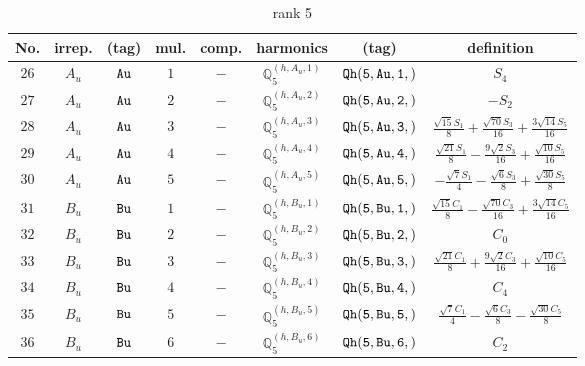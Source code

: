 \documentclass[fleqn,8pt]{jsarticle}
\begin{document}
\begin{table}[ht!]
\begin{center}
\caption{rank 5}
\renewcommand{\arraystretch}{1.3}
\begin{tabular}{cccccccc} \hline \hline
No. & irrep. & (tag) & mul. & comp. & harmonics & (tag) & definition \\ \hline
$ 26 $ & $ A_{u} $ & $ {\tt Au} $ & $ 1 $ & $ - $ & $ \mathbb{Q}_{5}^{(h,A_{u},1)} $ & $ {\tt Qh(5,Au,1,)} $ & $ S_{4} $ \\
$ 27 $ & $ A_{u} $ & $ {\tt Au} $ & $ 2 $ & $ - $ & $ \mathbb{Q}_{5}^{(h,A_{u},2)} $ & $ {\tt Qh(5,Au,2,)} $ & $ - S_{2} $ \\
$ 28 $ & $ A_{u} $ & $ {\tt Au} $ & $ 3 $ & $ - $ & $ \mathbb{Q}_{5}^{(h,A_{u},3)} $ & $ {\tt Qh(5,Au,3,)} $ & $ \frac{\sqrt{15} S_{1}}{8} + \frac{\sqrt{70} S_{3}}{16} + \frac{3 \sqrt{14} S_{5}}{16} $ \\
$ 29 $ & $ A_{u} $ & $ {\tt Au} $ & $ 4 $ & $ - $ & $ \mathbb{Q}_{5}^{(h,A_{u},4)} $ & $ {\tt Qh(5,Au,4,)} $ & $ \frac{\sqrt{21} S_{1}}{8} - \frac{9 \sqrt{2} S_{3}}{16} + \frac{\sqrt{10} S_{5}}{16} $ \\
$ 30 $ & $ A_{u} $ & $ {\tt Au} $ & $ 5 $ & $ - $ & $ \mathbb{Q}_{5}^{(h,A_{u},5)} $ & $ {\tt Qh(5,Au,5,)} $ & $ - \frac{\sqrt{7} S_{1}}{4} - \frac{\sqrt{6} S_{3}}{8} + \frac{\sqrt{30} S_{5}}{8} $ \\
$ 31 $ & $ B_{u} $ & $ {\tt Bu} $ & $ 1 $ & $ - $ & $ \mathbb{Q}_{5}^{(h,B_{u},1)} $ & $ {\tt Qh(5,Bu,1,)} $ & $ \frac{\sqrt{15} C_{1}}{8} - \frac{\sqrt{70} C_{3}}{16} + \frac{3 \sqrt{14} C_{5}}{16} $ \\
$ 32 $ & $ B_{u} $ & $ {\tt Bu} $ & $ 2 $ & $ - $ & $ \mathbb{Q}_{5}^{(h,B_{u},2)} $ & $ {\tt Qh(5,Bu,2,)} $ & $ C_{0} $ \\
$ 33 $ & $ B_{u} $ & $ {\tt Bu} $ & $ 3 $ & $ - $ & $ \mathbb{Q}_{5}^{(h,B_{u},3)} $ & $ {\tt Qh(5,Bu,3,)} $ & $ \frac{\sqrt{21} C_{1}}{8} + \frac{9 \sqrt{2} C_{3}}{16} + \frac{\sqrt{10} C_{5}}{16} $ \\
$ 34 $ & $ B_{u} $ & $ {\tt Bu} $ & $ 4 $ & $ - $ & $ \mathbb{Q}_{5}^{(h,B_{u},4)} $ & $ {\tt Qh(5,Bu,4,)} $ & $ C_{4} $ \\
$ 35 $ & $ B_{u} $ & $ {\tt Bu} $ & $ 5 $ & $ - $ & $ \mathbb{Q}_{5}^{(h,B_{u},5)} $ & $ {\tt Qh(5,Bu,5,)} $ & $ \frac{\sqrt{7} C_{1}}{4} - \frac{\sqrt{6} C_{3}}{8} - \frac{\sqrt{30} C_{5}}{8} $ \\
$ 36 $ & $ B_{u} $ & $ {\tt Bu} $ & $ 6 $ & $ - $ & $ \mathbb{Q}_{5}^{(h,B_{u},6)} $ & $ {\tt Qh(5,Bu,6,)} $ & $ C_{2} $ \\
 \hline \hline
\end{tabular}
\end{center}
\end{table}
\end{document}

